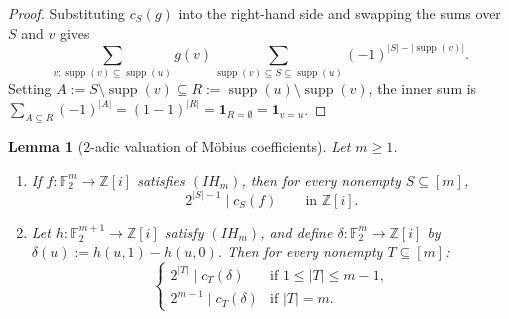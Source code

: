 \documentclass[11pt,a4paper]{article}
\theoremstyle{plain}
\newtheorem{lemma}{Lemma}[section]
\theoremstyle{definition}
\theoremstyle{remark}
\newcommand{\F}{\mathbb{F}}
\newcommand{\Zi}{\mathbb{Z}[i]}
\newcommand{\supp}{\operatorname{supp}}
\newcommand{\abs}[1]{\lvert#1\rvert}
\newcommand{\indic}[1]{\mathbf{1}_{#1}}
\numberwithin{equation}{section}
\begin{document}
\begin{proof}
Substituting $c_S(g)$ into the right-hand side and swapping the sums over $S$ and $v$ gives
\[
  \sum_{v : \supp(v) \subseteq \supp(u)} g(v) \sum_{\supp(v) \subseteq S \subseteq \supp(u)} (-1)^{\abs{S} - \abs{\supp(v)}}.
\]
Setting $A := S \setminus \supp(v) \subseteq R := \supp(u) \setminus \supp(v)$, the inner sum is $\sum_{A \subseteq R} (-1)^{\abs{A}} = (1 - 1)^{\abs{R}} = \indic{R = \emptyset} = \indic{v = u}$.
\end{proof}

\begin{lemma}[$2$-adic valuation of M\"obius coefficients]\label{lem:mobius-val}
Let $m \ge 1$.
\begin{enumerate}[label=(\roman*),leftmargin=2em]
  \item If $f : \F_2^m \to \Zi$ satisfies $(IH_m)$, then for every nonempty $S \subseteq [m]$,
  \[
    2^{\abs{S} - 1} \;\big|\; c_S(f) \qquad \text{in } \Zi.
  \]
  \item Let $h : \F_2^{m+1} \to \Zi$ satisfy $(IH_m)$, and define $\delta : \F_2^m \to \Zi$ by $\delta(u) := h(u, 1) - h(u, 0)$. Then for every nonempty $T \subseteq [m]$:
  \[
    \begin{cases}
      2^{\abs{T}} \;\big|\; c_T(\delta) & \text{if } 1 \le \abs{T} \le m - 1, \\[4pt]
      2^{m-1} \;\big|\; c_T(\delta) & \text{if } \abs{T} = m.
    \end{cases}
  \]
\end{enumerate}
\end{lemma}
\end{document}
